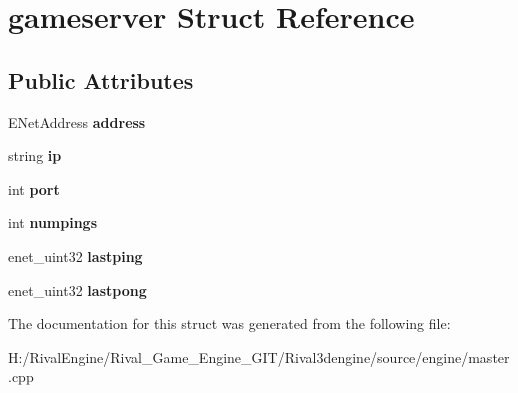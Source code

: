 \hypertarget{structgameserver}{}\section{gameserver Struct Reference}
\label{structgameserver}
\subsection*{Public Attributes}
\begin{DoxyCompactItemize}
\item 
\mbox{\label{structgameserver_ac7448414c74412c23111d2adbe3cff00}} 
E\+Net\+Address {\bfseries address}
\item 
\mbox{\label{structgameserver_a9bf2978b3a76a4f5427416cdac66d267}} 
string {\bfseries ip}
\item 
\mbox{\label{structgameserver_a3b1baafd52dc6239aed4b865a04f28be}} 
int {\bfseries port}
\item 
\mbox{\label{structgameserver_ab1ba9f229809ae585b1ccac91a5b533e}} 
int {\bfseries numpings}
\item 
\mbox{\label{structgameserver_ac77872cecf83320fd3b2515d2797971b}} 
enet\+\_\+uint32 {\bfseries lastping}
\item 
\mbox{\label{structgameserver_aecd4c7c26ba333f853093c60c6bc334d}} 
enet\+\_\+uint32 {\bfseries lastpong}
\end{DoxyCompactItemize}


The documentation for this struct was generated from the following file\+:\begin{DoxyCompactItemize}
\item 
H\+:/\+Rival\+Engine/\+Rival\+\_\+\+Game\+\_\+\+Engine\+\_\+\+G\+I\+T/\+Rival3dengine/source/engine/master.\+cpp\end{DoxyCompactItemize}
